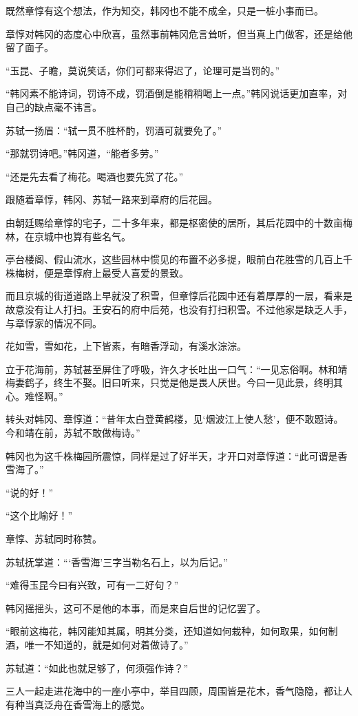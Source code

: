 既然章惇有这个想法，作为知交，韩冈也不能不成全，只是一桩小事而已。

章惇对韩冈的态度心中欣喜，虽然事前韩冈危言耸听，但当真上门做客，还是给他留了面子。

“玉昆、子瞻，莫说笑话，你们可都来得迟了，论理可是当罚的。”

“韩冈素不能诗词，罚诗不成，罚酒倒是能稍稍喝上一点。”韩冈说话更加直率，对自己的缺点毫不讳言。

苏轼一扬眉：“轼一贯不胜杯酌，罚酒可就要免了。”

“那就罚诗吧。”韩冈道，“能者多劳。”

“还是先去看了梅花。喝酒也要先赏了花。”

跟随着章惇，韩冈、苏轼一路来到章府的后花园。

由朝廷赐给章惇的宅子，二十多年来，都是枢密使的居所，其后花园中的十数亩梅林，在京城中也算有些名气。

亭台楼阁、假山流水，这些园林中惯见的布置不必多提，眼前白花胜雪的几百上千株梅树，便是章惇府上最受人喜爱的景致。

而且京城的街道道路上早就没了积雪，但章惇后花园中还有着厚厚的一层，看来是故意没有让人打扫。王安石的府中后苑，也没有打扫积雪。不过他家是缺乏人手，与章惇家的情况不同。

花如雪，雪如花，上下皆素，有暗香浮动，有溪水淙淙。

立于花海前，苏轼甚至屏住了呼吸，许久才长吐出一口气：“一见忘俗啊。林和靖梅妻鹤子，终生不娶。旧曰听来，只觉是他是畏人厌世。今曰一见此景，终明其心。难怪啊。”

转头对韩冈、章惇道：“昔年太白登黄鹤楼，见‘烟波江上使人愁’，便不敢题诗。今和靖在前，苏轼不敢做梅诗。”

韩冈也为这千株梅园所震惊，同样是过了好半天，才开口对章惇道：“此可谓是香雪海了。”

“说的好！”

“这个比喻好！”

章惇、苏轼同时称赞。

苏轼抚掌道：“‘香雪海’三字当勒名石上，以为后记。”

“难得玉昆今曰有兴致，可有一二好句？”

韩冈摇摇头，这可不是他的本事，而是来自后世的记忆罢了。

“眼前这梅花，韩冈能知其属，明其分类，还知道如何栽种，如何取果，如何制酒，唯一不知道的，就是如何对着做诗了。”

苏轼道：“如此也就足够了，何须强作诗？”

三人一起走进花海中的一座小亭中，举目四顾，周围皆是花木，香气隐隐，都让人有种当真泛舟在香雪海上的感觉。

